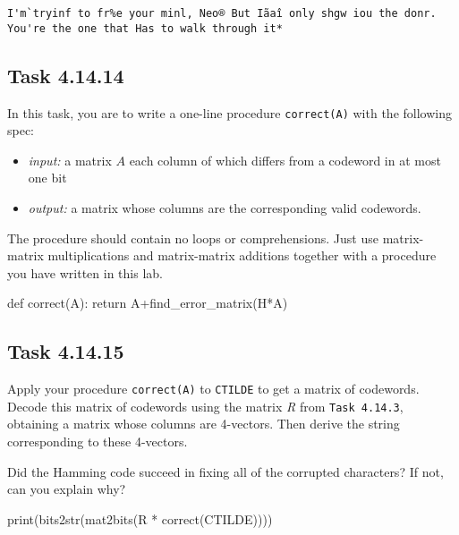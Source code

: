 \documentclass[
  letterpaper,
  DIV=11,
  numbers=noendperiod]{scrartcl}
\newenvironment{Shaded}{\begin{snugshade}}{\end{snugshade}}
\newcommand{\BuiltInTok}[1]{\textcolor[rgb]{0.00,0.23,0.31}{#1}}
\newcommand{\ControlFlowTok}[1]{\textcolor[rgb]{0.00,0.23,0.31}{#1}}
\newcommand{\KeywordTok}[1]{\textcolor[rgb]{0.00,0.23,0.31}{#1}}
\newcommand{\NormalTok}[1]{\textcolor[rgb]{0.00,0.23,0.31}{#1}}
\newcommand{\OperatorTok}[1]{\textcolor[rgb]{0.37,0.37,0.37}{#1}}
\begin{document}
\begin{lstlisting}
I'm`tryinf to fr%e your minl, Neo® But Iãaî only shgw iou the donr. You're the one that Has to walk through it*
\end{lstlisting}

\hypertarget{task-4.14.14}{%
\subsection{Task 4.14.14}\label{task-4.14.14}}

In this task, you are to write a one-line procedure \texttt{correct(A)}
with the following spec:

\begin{itemize}
\item \textit{input:} a matrix $A$ each column of which differs from a codeword in at most one bit
\item \textit{output:} a matrix whose columns are the corresponding valid codewords.
\end{itemize}

The procedure should contain no loops or comprehensions. Just use
matrix-matrix multiplications and matrix-matrix additions together with
a procedure you have written in this lab.

\begin{Shaded}
\begin{Highlighting}[numbers=left,,]
\KeywordTok{def}\NormalTok{ correct(A):}
  \ControlFlowTok{return}\NormalTok{ A}\OperatorTok{+}\NormalTok{find\_error\_matrix(H}\OperatorTok{*}\NormalTok{A)}
\end{Highlighting}
\end{Shaded}

\hypertarget{task-4.14.15}{%
\subsection{Task 4.14.15}\label{task-4.14.15}}

Apply your procedure \texttt{correct(A)} to \texttt{CTILDE} to get a
matrix of codewords. Decode this matrix of codewords using the matrix
\emph{R} from \texttt{Task\ 4.14.3}, obtaining a matrix whose columns
are 4-vectors. Then derive the string corresponding to these 4-vectors.

Did the Hamming code succeed in fixing all of the corrupted characters?
If not, can you explain why?

\begin{Shaded}
\begin{Highlighting}[numbers=left,,]
\BuiltInTok{print}\NormalTok{(bits2str(mat2bits(R }\OperatorTok{*}\NormalTok{ correct(CTILDE))))}
\end{Highlighting}
\end{Shaded}
\end{document}
